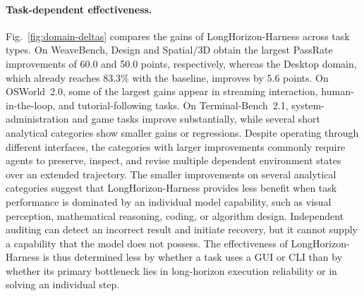 \paragraph{Task-dependent effectiveness.}
Fig.~\ref{fig:domain-deltas} compares the gains of LongHorizon-Harness across task types. On WeaveBench, Design and Spatial/3D obtain the largest PassRate improvements of 60.0 and 50.0 points, respectively, whereas the Desktop domain, which already reaches 83.3\% with the baseline, improves by 5.6 points. On OSWorld~2.0, some of the largest gains appear in streaming interaction, human-in-the-loop, and tutorial-following tasks. On Terminal-Bench~2.1, system-administration and game tasks improve substantially, while several short analytical categories show smaller gains or regressions. Despite operating through different interfaces, the categories with larger improvements commonly require agents to preserve, inspect, and revise multiple dependent environment states over an extended trajectory. The smaller improvements on several analytical categories suggest that LongHorizon-Harness provides less benefit when task performance is dominated by an individual model capability, such as visual perception, mathematical reasoning, coding, or algorithm design. Independent auditing can detect an incorrect result and initiate recovery, but it cannot supply a capability that the model does not possess. The effectiveness of LongHorizon-Harness is thus determined less by whether a task uses a GUI or CLI than by whether its primary bottleneck lies in long-horizon execution reliability or in solving an individual step.


